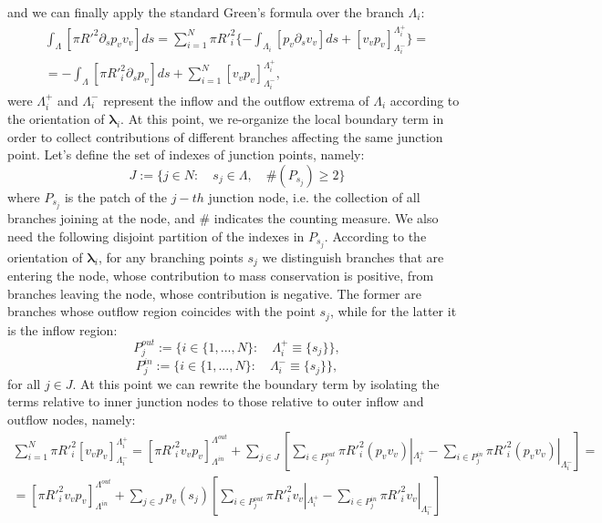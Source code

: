 \documentclass[a4paper]{report}
\begin{document}
and we can finally apply the standard Green's formula over the branch $\Lambda_i$:
\begin{equation}
\begin{split}
\int_{\Lambda} [\pi R'^2 \partial_s p_v v_v] ds =\sum^N_{i=1}\pi R'^2_i 	\{-  \int_{\Lambda_i}[ p_v  \partial_s v_v]ds+ [v_v p_v]^{\Lambda_i^+}_{\Lambda_i^-}\}=\\
=-\int_{\Lambda} [\pi R'^2_i \partial_s p_v]ds + \sum^N_{i=1}[v_v p_v]^{\Lambda_i^+}_{\Lambda_i^-},
\end{split}
\end{equation}
were $\Lambda_i^+$ and $\Lambda_i^-$ represent the inflow and the outflow extrema of $\Lambda_i$ according to the orientation of $\boldsymbol{\lambda}_i$. At this point, we re-organize the local boundary term in order to collect contributions of different branches affecting the same junction point. Let's define the set of indexes of junction points, namely:
\begin{equation*}
J:=\{ j \in N : \quad s_j \in \Lambda, \quad \#(P_{s_j})\geq 2 \}
\end{equation*}
where $P_{s_j}$ is the patch of the $j-th$ junction node, i.e. the collection of all branches joining at the node, and $\#$ indicates the counting measure. We also need the following disjoint partition of the indexes in $P_{s_j}$. According to the orientation of $\boldsymbol{\lambda}_i$, for any branching points $s_j$ we distinguish branches that are entering the node, whose contribution to mass conservation is positive, from branches leaving the node, whose contribution is negative. The former are branches whose outflow region coincides with the point $s_j$, while for the latter it is the inflow region:
\begin{equation}
P^{out}_j:=\{ i \in \{1,...,N\}: \quad \Lambda^{+}_{i} \equiv \{s_j\} \},
\end{equation}
\begin{equation}
P^{in}_j:=\{i \in \{1,...,N\}:\quad \Lambda^-_i \equiv \{s_j\} \},
\end{equation}
for all $j \in J$. At this point we can rewrite the boundary term by isolating the terms relative to inner junction nodes to those relative to outer inflow and outflow nodes, namely:
\begin{equation}
\begin{split}
\sum^N_{i=1} \pi R'^2_i  [v_v p_v]^{\Lambda_i^+}_{\Lambda_i^-} = [\pi R'^2_i v_v p_v]^{\Lambda^{out}}_{\Lambda^{in}}+ \sum_{j \in J }[\sum_{i \in P_j^{out}} \pi R'^2_i (p_v v_v)|_{\Lambda_i^+}-\sum_{i \in P_j^{in}} \pi R'^2_i (p_v v_v)|_{\Lambda_i^-}]=\\
=[\pi R'^2_i v_v p_v]^{\Lambda^{out}}_{\Lambda^{in}}+ \sum_{j \in J }p_v(s_j)[\sum_{i \in P_j^{out}} \pi R'^2_i v_v|_{\Lambda_i^+}-\sum_{i \in P_j^{in}} \pi R'^2_i v_v|_{\Lambda_i^-}]
\end{split}
\end{equation}
\end{document}
